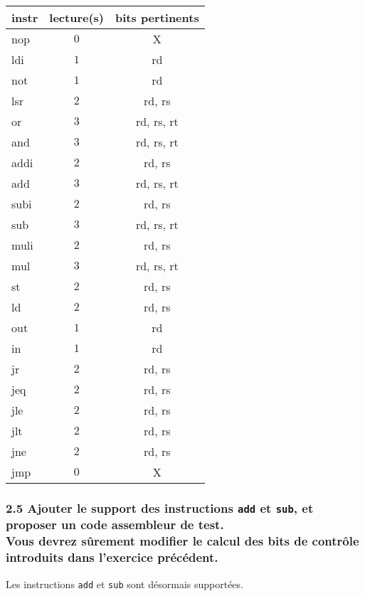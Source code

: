 \documentclass[twoside, 12pt, a4paper]{article}
\begin{document}
\begin{center}
	\ttfamily
	\begin{tabular}{|l|c|c|}
		\hline
		instr    & lecture(s) & bits pertinents \\
		\hline
		nop		&  $0$          & X \\
		ldi		&  $1$          & rd \\
		\hline
		not		&  $1$          & rd \\
		lsr		&  $2$          & rd, rs \\
		or		&  $3$          & rd, rs, rt \\
		and		&  $3$          & rd, rs, rt \\
		\hline
		addi	&  $2$          & rd, rs \\
		add		&  $3$          & rd, rs, rt \\
		subi	&  $2$          & rd, rs \\
		sub		&  $3$          & rd, rs, rt \\
		\hline
		muli	&  $2$          & rd, rs \\
		mul		&  $3$          & rd, rs, rt \\
		\hline
		st		&  $2$          & rd, rs \\
		ld		&  $2$          & rd, rs \\
		out		&  $1$          & rd \\
		in		&  $1$          & rd \\
		\hline
		jr		&  $2$          & rd, rs \\
		\hline
		jeq		&  $2$          & rd, rs \\
		jle		&  $2$          & rd, rs \\
		jlt		&  $2$          & rd, rs \\
		jne		&  $2$          & rd, rs \\
		\hline
		jmp		&  $0$          & X \\
		\hline
	\end{tabular}
\end{center}

        \subsubsection*{\textbf{2.5} Ajouter le support des instructions \texttt{add} et \texttt{sub}, et proposer un code assembleur de test. \\
        Vous devrez sûrement modifier le calcul des bits de contrôle introduits dans l'exercice précédent.}

Les instructions \texttt{add} et \texttt{sub} sont désormais supportées.
\end{document}
